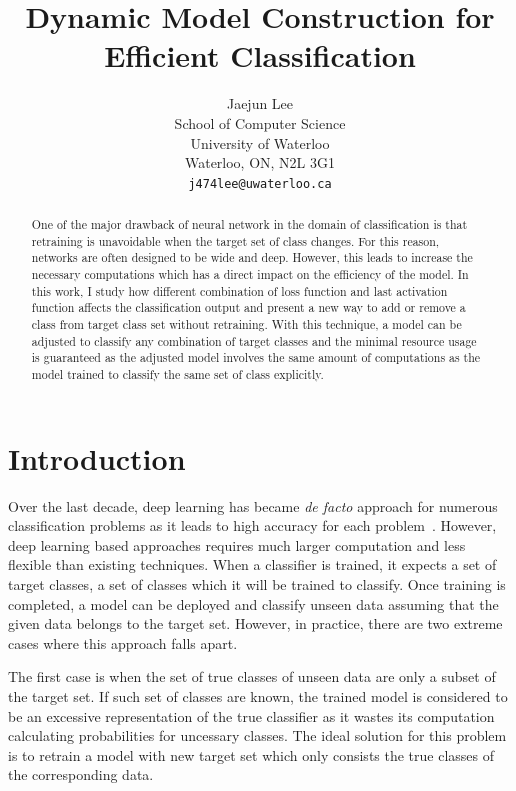 \documentclass{article}
\title{Dynamic Model Construction for Efficient Classification}
\author{
    Jaejun Lee \\
    School of Computer Science\\
    University of Waterloo\\
    Waterloo, ON, N2L 3G1 \\
    \texttt{j474lee@uwaterloo.ca} \\
}
\begin{document}
\maketitle

\begin{abstract}

One of the major drawback of neural network in the domain of classification is that retraining is unavoidable when the target set of class changes. For this reason, networks are often designed to be wide and deep. However, this leads to increase the necessary computations which has a direct impact on the efficiency of the model. In this work, I study how different combination of loss function and last activation function affects the classification output and present a new way to add or remove a class from target class set without retraining. With this technique, a model can be adjusted to classify any combination of target classes and the minimal resource usage is guaranteed as the adjusted model involves the same amount of computations as the model trained to classify the same set of class explicitly.

\end{abstract}

\section{Introduction}

Over the last decade, deep learning has became {\it de facto} approach for numerous classification problems as it leads to high accuracy for each problem~\cite{}. However, deep learning based approaches requires much larger computation and less flexible than existing techniques. When a classifier is trained, it expects a set of target classes, a set of classes which it will be trained to classify. Once training is completed, a model can be deployed and classify unseen data assuming that the given data belongs to the target set. However, in practice, there are two extreme cases where this approach falls apart.

The first case is when the set of true classes of unseen data are only a subset of the target set. If such set of classes are known, the trained model is considered to be an excessive representation of the true classifier as it wastes its computation calculating probabilities for uncessary classes. The ideal solution for this problem is to retrain a model with new target set which only consists the true classes of the corresponding data.
\end{document}
